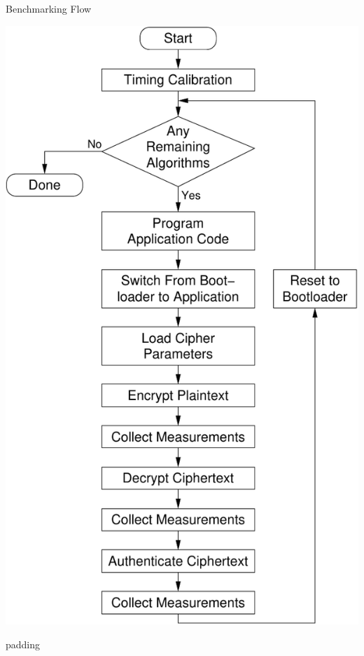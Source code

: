 \documentclass[xcolor=pdftex,dvipsnames,table,final]{beamer}
\begin{document}
\begin{frame}[fragile]{}
\begin{columns}[t, totalwidth=\textwidth]
\begin{column}{.675\linewidth}
\begin{columns}
\begin{column}{.473\linewidth}
      \begin{block}{Benchmarking Flow}
        \begin{center}
          \includegraphics[scale=1.2]{../figures/xxbx_flow}
        \end{center} 
          \begin{center}
            \begin{minipage}{0.9\linewidth}
            \begin{beamercolorbox}[rounded=true]{padding}%

\end{beamercolorbox}
\end{minipage}
\end{center}
\end{block}
\end{column}
\end{columns}
\end{column}
\end{columns}
\end{frame}
\end{document}
